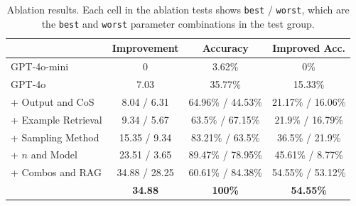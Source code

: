

\begin{table}[h]
\caption{Ablation results. Each cell in the ablation tests shows \texttt{best} / \texttt{worst}, which are the \texttt{best} and \texttt{worst} parameter combinations in the test group.}
\label{tab:abl}
\centering
\small
\begin{tabular}{l|ccc}
\toprule
& Improvement& Accuracy & Improved Acc.\\
\midrule
GPT-4o-mini&  0 & 3.62\% & 0\%\\
GPT-4o & 7.03 & 35.77\% & 15.33\%\\
+ Output and CoS &8.04 / 6.31 & 64.96\% / 44.53\% & 21.17\% / 16.06\% \\
+ Example Retrieval & 9.34 / 5.67 & 63.5\% / 67.15\% & 21.9\% / 16.79\% \\
+ Sampling Method &15.35 / 9.34 & 83.21\% / 63.5\% & 36.5\% / 21.9\% \\
+ $n$ and Model & 23.51 / 3.65 & 89.47\% / 78.95\% & 45.61\% / 8.77\% \\
+ Combos and RAG & 34.88 / 28.25 & 60.61\% / 84.38\% & 54.55\% / 53.12\% \\
\midrule
\textbf{\methodname{}} & \textbf{34.88} & \textbf{100\%} & \textbf{54.55\%}\\
\bottomrule
\end{tabular}

\vspace{-1em} %
\end{table}